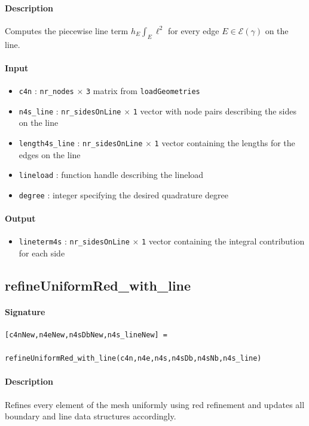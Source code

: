 \documentclass[11pt,a4paper]{article}
\newcommand{\matrixdim}[2]{\texttt{#1} $\times$ \texttt{#2}}
\begin{document}
\paragraph{Description}
Computes the piecewise line term \(h_E \int_E \ell^2\) for every edge $E \in \mathcal{E}(\gamma)$ on the line.

\paragraph{Input}
\begin{itemize}
    \item \texttt{c4n} : \matrixdim{nr\_nodes}{3} matrix from \texttt{loadGeometries}
    \item \texttt{n4s\_line} : \matrixdim{nr\_sidesOnLine}{1} vector with node pairs describing the sides on the line
    \item \texttt{length4s\_line} : \matrixdim{nr\_sidesOnLine}{1} vector containing the lengths for the edges on the line
    \item \texttt{lineload} : function handle describing the lineload
    \item \texttt{degree} : integer specifying the desired quadrature degree
\end{itemize}

\paragraph{Output}
\begin{itemize}
    \item \texttt{lineterm4s} : \matrixdim{nr\_sidesOnLine}{1} vector containing the integral contribution for each side
\end{itemize}


\subsection{refineUniformRed\_with\_line}

\paragraph{Signature}
\begin{verbatim}
[c4nNew,n4eNew,n4sDbNew,n4s_lineNew] = 
                    refineUniformRed_with_line(c4n,n4e,n4s,n4sDb,n4sNb,n4s_line)
\end{verbatim}

\paragraph{Description}
Refines every element of the mesh uniformly using red refinement and 
updates all boundary and line data structures accordingly.
\end{document}
